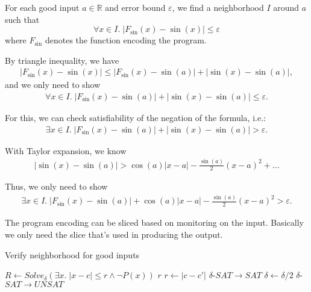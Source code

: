 For each good input $a\in \mathbb{R}$ and error bound $\varepsilon$,
we find a neighborhood $I$ around $a$ such that
$$\forall x\in I.\; |F_{\sin}(x)-\sin(x)|\leq \varepsilon$$
where $F_{\sin}$ denotes the function encoding the program.

By triangle inequality, we have
\begin{eqnarray}
|F_{\sin}(x) - \sin(x)| \leq |F_{\sin}(x) - \sin(a)| + |\sin(x) - \sin(a)|,
\end{eqnarray}
and we only need to show
\begin{eqnarray}
\forall x\in I.\; |F_{\sin}(x) - \sin(a)| + |\sin(x) - \sin(a)| \leq \varepsilon.
\end{eqnarray}

For this, we can check satisfiability of the negation of the formula, i.e.:
\begin{eqnarray}
\exists x\in I.\; |F_{\sin}(x) - \sin(a)| + |\sin(x) - \sin(a)| > \varepsilon.
\end{eqnarray}

With Taylor expansion, we know
\begin{eqnarray}
|\sin(x) - \sin(a)| > \cos(a) |x - a| - \frac{\sin(a)}{2}(x-a)^2 + ... %
\end{eqnarray}

Thus, we only need to show
\begin{eqnarray}
\exists x\in I.\; |F_{\sin}(x) - \sin(a)| + \cos(a) |x - a| -
\frac{\sin(a)}{2}(x-a)^2 > \varepsilon.
\end{eqnarray}

The program encoding can be sliced based on monitoring on the input.
Basically we only need the slice that's used in producing the output.

\begin{algorithm}
  \centering
  \caption{Verify neighborhood for good inputs}
  \begin{algorithmic}[1]
            \State $R \gets Solve_{\delta}(\exists x. \; |x - c| \le r \land \neg P(x))$
                \State \Return $r$
                    \State $r \gets |c - c'|$
                    \Comment $\delta$-$SAT \to SAT$
                \Else
                    \State $\delta \gets \delta / 2$
                    \Comment $\delta$-$SAT \to UNSAT$
                \EndIf
            \EndIf
        \EndWhile
    \EndProcedure
  \end{algorithmic}
\end{algorithm}

